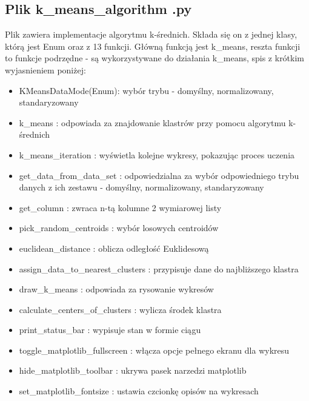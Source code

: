 \documentclass{classrep}
\begin{document}
{	\subsection{Plik k\_means\_algorithm .py}
	{
		Plik zawiera implementacje algorytmu k-średnich. Składa się on z jednej klasy, którą jest Enum oraz z 13 funkcji. Główną funkcją jest k\_means, reszta funkcji to funkcje podrzędne - są wykorzystywane do działania k\_means, spis z krótkim wyjasnieniem poniżej: 
	\begin{itemize}
		\item KMeansDataMode(Enum): wybór trybu - domyślny, normalizowany, standaryzowany
		\item k\_means : odpowiada za znajdowanie klastrów przy pomocu algorytmu k-średnich
		\item k\_means\_iteration : wyświetla kolejne wykresy, pokazując proces uczenia
		\item get\_data\_from\_data\_set : odpowiedzialna za wybór odpowiedniego trybu danych z ich zestawu - domyślny, normalizowany, standaryzowany
		\item get\_column : zwraca n-tą kolumne 2 wymiarowej listy
		\item pick\_random\_centroids : wybór losowych centroidów
		\item euclidean\_distance : oblicza odległość Euklidesową
		\item assign\_data\_to\_nearest\_clusters : przypisuje dane do najbliższego klastra
		\item draw\_k\_means : odpowiada za rysowanie wykresów
		\item calculate\_centers\_of\_clusters : wylicza środek klastra
		\item print\_status\_bar : wypisuje stan w formie ciągu
		\item toggle\_matplotlib\_fullscreen : włącza opcje pełnego ekranu dla wykresu
		\item hide\_matplotlib\_toolbar : ukrywa pasek narzedzi matplotlib
		\item set\_matplotlib\_fontsize : ustawia czcionkę opisów na wykresach
	\end{itemize}
	}
}
\end{document}
